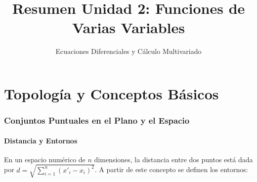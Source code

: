 \documentclass[a4paper,12pt]{article}
\title{\textbf{Resumen Unidad 2: Funciones de Varias Variables}}
\author{Ecuaciones Diferenciales y Cálculo Multivariado}
\date{}
\begin{document}
\maketitle

\part{Topología y Conceptos Básicos}

\section{Conjuntos Puntuales en el Plano y el Espacio}

\subsection{Distancia y Entornos}
En un espacio numérico de $n$ dimensiones, la distancia entre dos puntos está dada por $d = \sqrt{\sum_{i=1}^{n}(x'_{i} - x_i)^2}$.
A partir de este concepto se definen los entornos:
\end{document}

